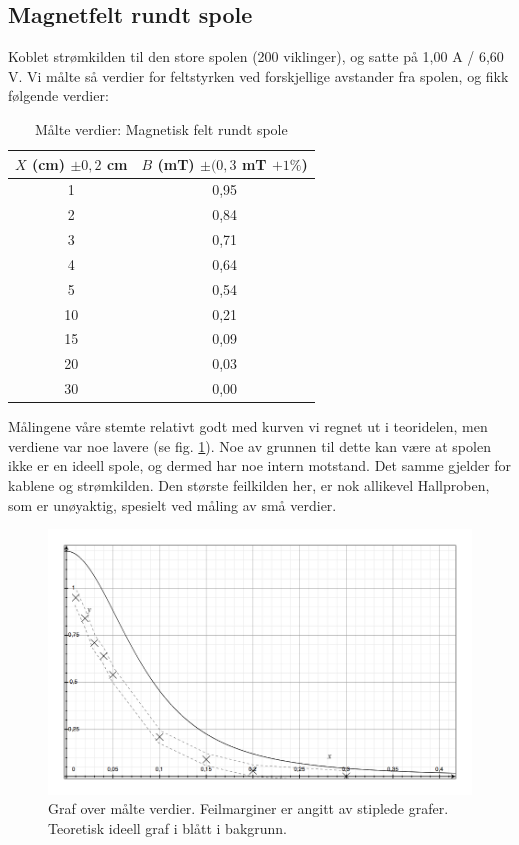 \documentclass[12pt,norsk,a4paper]{article}
\begin{document}
\subsection{Magnetfelt rundt spole}
Koblet strømkilden til den store spolen (200 viklinger), og satte på 1,00 A / 6,60 V.
Vi målte så verdier for feltstyrken ved forskjellige avstander fra spolen, og fikk følgende verdier:
\\
\begin{table}[H]
\begin{center}
	\begin{tabular}{ | c | c |}
	\hline
	$X$ (cm) $\pm0,2$ cm  & $B$ (mT) $\pm(0,3$ mT $+1\%$) \\ \hline
    1 & 0,95\\ \hline
    2 & 0,84\\ \hline
    3 & 0,71\\ \hline
    4 & 0,64\\ \hline
    5 & 0,54\\ \hline
    10 & 0,21\\ \hline
    15 & 0,09\\ \hline
    20 & 0,03\\ \hline
    30 & 0,00\\ \hline
    \hline
    \end{tabular}
    \end{center}
    \caption{Målte verdier: Magnetisk felt rundt spole}

\end{table}
Målingene våre stemte relativt godt med kurven vi regnet ut i teoridelen, men verdiene var noe lavere (se fig. \ref{fig:maalteverdier}). Noe av grunnen til dette kan være at spolen ikke er en ideell spole, og dermed har noe intern motstand. Det samme gjelder for kablene og strømkilden. Den største feilkilden her, er nok allikevel Hallproben, som er unøyaktig, spesielt ved måling av små verdier.

\begin{figure}[H]
\includegraphics[scale=0.4]{labrapport-teoridel-ligning1.jpg}
\caption{Graf over målte verdier. Feilmarginer er angitt av stiplede grafer. Teoretisk ideell graf i blått i bakgrunn. }
\label{fig:maalteverdier}
\end{figure}
\end{document}
